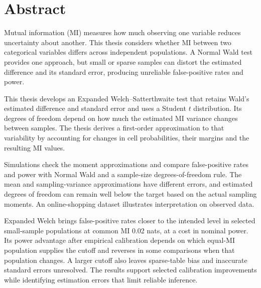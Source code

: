 \chapter*{Abstract}

Mutual information (MI) measures how much observing one variable reduces
uncertainty about another. This thesis considers whether MI between two
categorical variables differs across independent populations. A Normal
Wald test provides one approach, but small or sparse samples can distort
the estimated difference and its standard error, producing unreliable
false-positive rates and power.

This thesis develops an Expanded Welch--Satterthwaite test that retains
Wald's estimated difference and standard error and uses a Student \(t\)
distribution. Its degrees of freedom depend on how much the estimated
MI variance changes between samples. The thesis derives a first-order
approximation to that variability by accounting for changes in cell
probabilities, their margins and the resulting MI values.

Simulations check the moment approximations and compare false-positive
rates and power with Normal Wald and a sample-size degrees-of-freedom
rule. The mean and sampling-variance approximations have different errors,
and estimated degrees of freedom can remain well below the target based
on the actual sampling moments. An online-shopping dataset illustrates
interpretation on observed data.

Expanded Welch brings false-positive rates closer to the intended level
in selected small-sample populations at common MI 0.02 nats, at a cost
in nominal power. Its
power advantage after empirical calibration depends on which equal-MI
population supplies the cutoff and reverses in some comparisons when
that population changes. A larger cutoff also leaves sparse-table bias
and inaccurate standard errors unresolved. The results support selected
calibration improvements while identifying estimation errors that limit
reliable inference.
